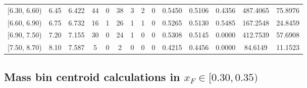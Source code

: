 \begin{table}[htbp]
{\begin{tabular}{cc|c|cccccc|ccc|cc}
        {[6.30, 6.60)} & 6.45 & 6.422 & 44 & 0 & 38 & 3 & 2 & 0 & 0.5450 & 0.5106 & 0.4356 & 487.4065 & 75.8976 \\
        {[6.60, 6.90)} & 6.75 & 6.732 & 16 & 1 & 26 & 1 & 1 & 0 & 0.5265 & 0.5130 & 0.5485 & 167.2548 & 24.8459 \\
        {[6.90, 7.50)} & 7.20 & 7.155 & 30 & 0 & 24 & 1 & 0 & 0 & 0.5308 & 0.5145 & 0.0000 & 412.7539 & 57.6908 \\
        {[7.50, 8.70)} & 8.10 & 7.587 & 5 & 0 & 2 & 0 & 0 & 0 & 0.4215 & 0.4456 & 0.0000 & 84.6149 & 11.1523 \\
        \hline\hline
    \end{tabular}
    }
\end{table}

\clearpage
\subsection{\texorpdfstring{Mass bin centroid calculations in $x_F \in [0.30, 0.35)$}{Mass bin centroid calculations in x\_F in [0.30, 0.35)]}}

